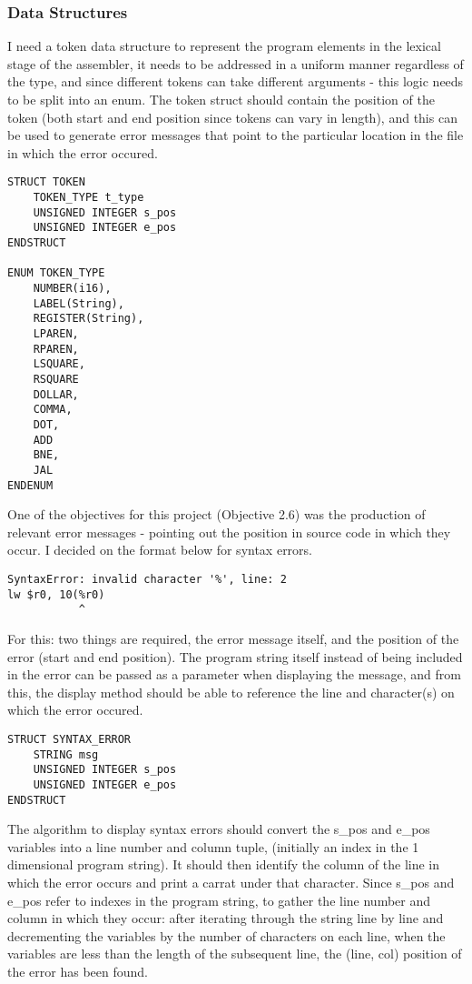 \subsubsection{Data Structures}

I need a token data structure to represent the program elements in the lexical stage of the assembler, it needs to be addressed in a uniform manner regardless of the type, and since different tokens can take different arguments - this logic needs to be split into an enum. The token struct should contain the position of the token (both start and end position since tokens can vary in length), and this can be used to generate error messages that point to the particular location in the file in which the error occured. 

\begin{lstlisting}
STRUCT TOKEN 
    TOKEN_TYPE t_type
    UNSIGNED INTEGER s_pos 
    UNSIGNED INTEGER e_pos 
ENDSTRUCT 

ENUM TOKEN_TYPE
    NUMBER(i16),
    LABEL(String),
    REGISTER(String),
    LPAREN,
    RPAREN,
    LSQUARE,
    RSQUARE
    DOLLAR,
    COMMA,
    DOT,
    ADD 
    BNE, 
    JAL
ENDENUM
\end{lstlisting}

One of the objectives for this project (Objective 2.6) was the production of relevant error messages - pointing out the position in source code in which they occur. I decided on the format below for syntax errors. 

\begin{lstlisting}
SyntaxError: invalid character '%', line: 2
lw $r0, 10(%r0)
           ^
\end{lstlisting}

For this: two things are required, the error message itself, and the position of the error (start and end position). The program string itself instead of being included in the error can be passed as a parameter when displaying the message, and from this, the display method should be able to reference the line and character(s) on which the error occured.

\begin{lstlisting}
STRUCT SYNTAX_ERROR
    STRING msg
    UNSIGNED INTEGER s_pos 
    UNSIGNED INTEGER e_pos
ENDSTRUCT
\end{lstlisting}

The algorithm to display syntax errors should convert the s\_pos and e\_pos variables into a line number and column tuple, (initially an index in the 1 dimensional program string). It should then identify the column of the line in which the error occurs and print a carrat under that character. Since s\_pos and e\_pos refer to indexes in the program string, to gather the line number and column in which they occur: after iterating through the string line by line and decrementing the variables by the number of characters on each line, when the variables are less than the length of the subsequent line, the (line, col) position of the error has been found.

